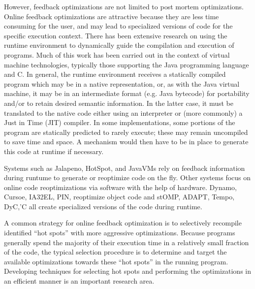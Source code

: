 However, feedback optimizations are not limited to post mortem
optimizations.
Online feedback optimizations are attractive because they are less time consuming for the user, and may lead to specialized versions of code for the specific execution context.
There has been extensive research on using the runtime environment to
dynamically guide the compilation and execution of programs. Much of this work
has been carried out in the context of virtual machine technologies, typically
those supporting the Java programming language and C.  In general, the runtime
environment receives a statically compiled program which may be in a native
representation, or, as with the Java virtual machine, it may be in an
intermediate format (e.g. Java bytecode) for portability and/or to retain
desired semantic information.  In the latter case, it must be translated to
the native code either using an interpreter or (more commonly) a Just in Time
(JIT) compiler.  In some implementations, some portions of the program are
statically predicted to rarely execute; these may remain uncompiled to save
time and space. A mechanism would then have to be in place to generate this
code at runtime if necessary.

Systems such as  Jalapeno\cite{Alpern:2000:JVM:1011388.1011400}, HotSpot, and JavaVMs rely on feedback
information during runtume to generate or reoptimize code on the fly.
Other systems focus on online code reoptimizations via software with the
help of hardware. Dynamo, Cursoe, IA32EL, PIN, reoptimize
object code and stOMP, ADAPT\cite{Voss:2001:HAP:568014.379583}, Tempo, DyC,'C all create specialized versions
of the code during runtime.

A common strategy for online feedback optimization is to selectively recompile
identified ``hot spots'' with more aggressive optimizations.  Because programs
generally spend the majority of their execution time in a relatively small
fraction of the code, the typical selection procedure is to determine and
target the available optimizations towards these ``hot spots'' in the running
program.  Developing techniques for selecting hot spots and performing the
optimizations in an efficient manner is an important research area.


